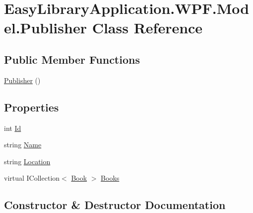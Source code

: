 \hypertarget{class_easy_library_application_1_1_w_p_f_1_1_model_1_1_publisher}{}\section{Easy\+Library\+Application.\+W\+P\+F.\+Model.\+Publisher Class Reference}
\label{class_easy_library_application_1_1_w_p_f_1_1_model_1_1_publisher}
\subsection*{Public Member Functions}
\begin{DoxyCompactItemize}
\item 
\mbox{\hyperlink{class_easy_library_application_1_1_w_p_f_1_1_model_1_1_publisher_a849e7d6f877b1a2869c96172d45458b2}{Publisher}} ()
\end{DoxyCompactItemize}
\subsection*{Properties}
\begin{DoxyCompactItemize}
\item 
int \mbox{\hyperlink{class_easy_library_application_1_1_w_p_f_1_1_model_1_1_publisher_a473b47667f42bcc479cf40841876df03}{Id}}
\item 
string \mbox{\hyperlink{class_easy_library_application_1_1_w_p_f_1_1_model_1_1_publisher_ab980c2677a2c3ee0504b3ae099323b59}{Name}}
\item 
string \mbox{\hyperlink{class_easy_library_application_1_1_w_p_f_1_1_model_1_1_publisher_ac77101b1d1ee9da722d597cc80a4b9eb}{Location}}
\item 
virtual I\+Collection$<$ \mbox{\hyperlink{class_easy_library_application_1_1_w_p_f_1_1_model_1_1_book}{Book}} $>$ \mbox{\hyperlink{class_easy_library_application_1_1_w_p_f_1_1_model_1_1_publisher_ae71d2bcd48629f3da587e33684055116}{Books}}
\end{DoxyCompactItemize}


\subsection{Constructor \& Destructor Documentation}
\mbox{\label{class_easy_library_application_1_1_w_p_f_1_1_model_1_1_publisher_a849e7d6f877b1a2869c96172d45458b2}} 
